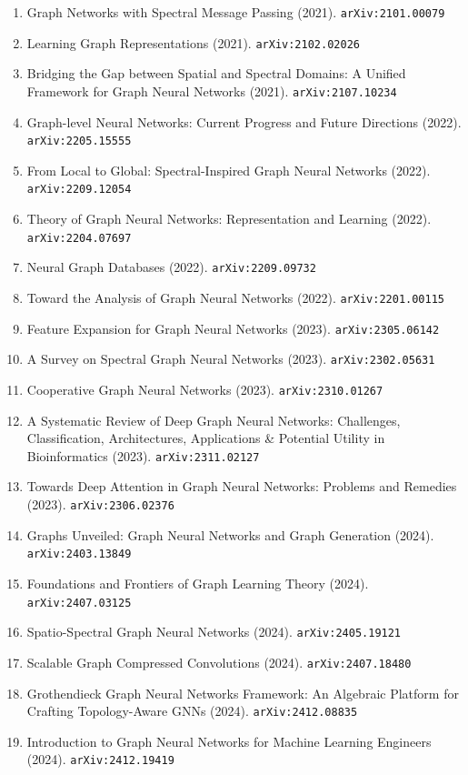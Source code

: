 \documentclass[11pt]{article}
\begin{document}
\begin{enumerate}
  \item Graph Networks with Spectral Message Passing (2021). \texttt{arXiv:2101.00079}
  \item Learning Graph Representations (2021). \texttt{arXiv:2102.02026}
  \item Bridging the Gap between Spatial and Spectral Domains: A Unified
  Framework for Graph Neural Networks (2021). \texttt{arXiv:2107.10234}
  \item Graph-level Neural Networks: Current Progress and Future Directions (2022). \texttt{arXiv:2205.15555}
  \item From Local to Global: Spectral-Inspired Graph Neural Networks (2022). \texttt{arXiv:2209.12054}
  \item Theory of Graph Neural Networks: Representation and Learning (2022). \texttt{arXiv:2204.07697}
  \item Neural Graph Databases (2022). \texttt{arXiv:2209.09732}
  \item Toward the Analysis of Graph Neural Networks (2022). \texttt{arXiv:2201.00115}
  \item Feature Expansion for Graph Neural Networks (2023). \texttt{arXiv:2305.06142}
  \item A Survey on Spectral Graph Neural Networks (2023). \texttt{arXiv:2302.05631}
  \item Cooperative Graph Neural Networks (2023). \texttt{arXiv:2310.01267}
  \item A Systematic Review of Deep Graph Neural Networks: Challenges,
  Classification, Architectures, Applications \& Potential Utility in
  Bioinformatics (2023). \texttt{arXiv:2311.02127}
  \item Towards Deep Attention in Graph Neural Networks: Problems and Remedies (2023). \texttt{arXiv:2306.02376}
  \item Graphs Unveiled: Graph Neural Networks and Graph Generation (2024). \texttt{arXiv:2403.13849}
  \item Foundations and Frontiers of Graph Learning Theory (2024). \texttt{arXiv:2407.03125}
  \item Spatio-Spectral Graph Neural Networks (2024). \texttt{arXiv:2405.19121}
  \item Scalable Graph Compressed Convolutions (2024). \texttt{arXiv:2407.18480}
  \item Grothendieck Graph Neural Networks Framework: An Algebraic Platform for Crafting Topology-Aware GNNs (2024). \texttt{arXiv:2412.08835}
  \item Introduction to Graph Neural Networks for Machine Learning Engineers (2024). \texttt{arXiv:2412.19419}

\end{enumerate}
\end{document}
